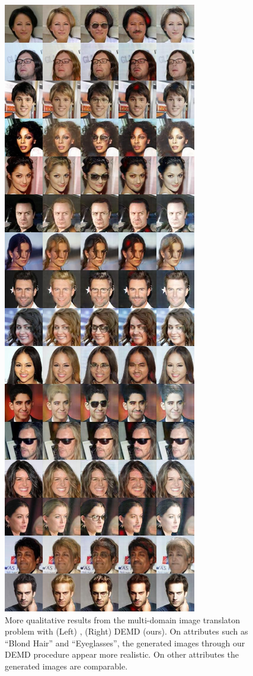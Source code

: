 \begin{figure}
    \includegraphics[height=0.85\textheight]{6_demd/figs/mwgan_res/demd-00003-images.jpg}
    \caption{More qualitative results from the multi-domain image translaton problem with (Left) \cite{cao2019multi}, (Right) DEMD (ours). On attributes such as ``Blond Hair'' and ``Eyeglasses'', the generated images through our DEMD procedure appear more realistic. On other attributes the generated images are comparable. }
    \label{fig:moreganres2}
\end{figure}